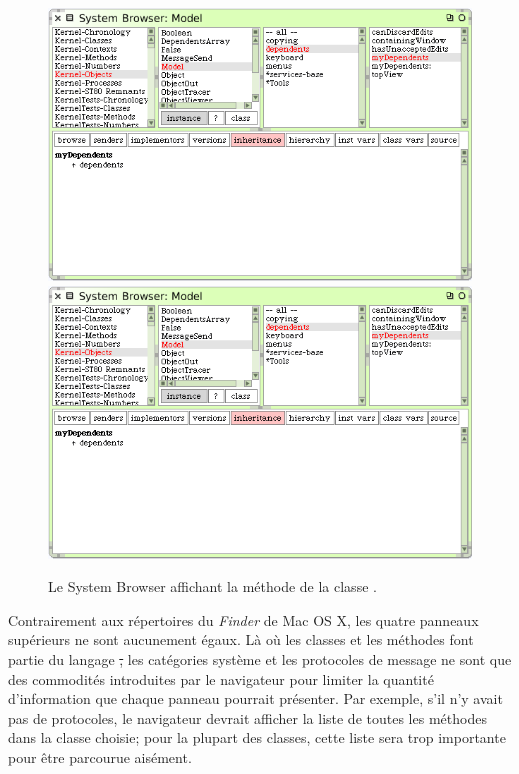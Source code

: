 \documentclass[a4paper,10pt,twoside]{book}
\begin{document}
\begin{figure}[htbp]
   \centering
   \ifluluelse
	   {\includegraphics[width=\textwidth]{SystemBrowserMyDependents}}
	   {\includegraphics[scale=.7]{SystemBrowserMyDependents}}
   \caption{Le System Browser affichant la m\'ethode  de la classe .
   \label{fig:SystemBrowserMyDependents}}
\end{figure}

Contrairement aux r\'epertoires du \emph{Finder} de Mac OS X, les quatre panneaux sup\'erieurs ne sont aucunement \'egaux.
L\`a o\`u les classes et les m\'ethodes font partie du langage \st, les cat\'egories syst\`eme et les protocoles de message ne sont que des commodités
introduites par le navigateur pour limiter la quantit\'e d'information que chaque panneau pourrait pr\'esenter.
Par exemple, s'il n'y avait pas de protocoles, le navigateur devrait afficher
la liste de toutes les m\'ethodes dans la classe choisie; pour la plupart des classes, cette liste sera trop importante pour \^etre parcourue ais\'ement.
\end{document}
